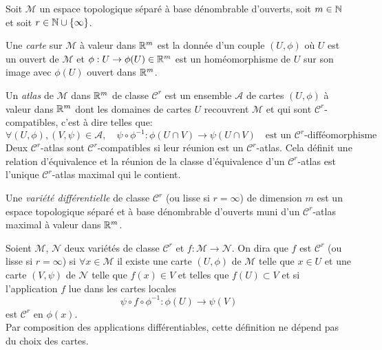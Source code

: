\documentclass[12pt, a4paper]{book}
\begin{document}
Soit $\mathcal{M}$ un espace topologique séparé à base dénombrable d'ouverts, soit $m\in \mathbb{N}$ et soit $r\in \mathbb{N} \cup \{\infty\}$.

\begin{defi}[Carte]
Une \emph{carte} sur $\mathcal{M}$ à valeur dans $\mathbb{R} ^m$ est la donnée d'un couple $(U, \phi)$ où $U$ est un ouvert de $\mathcal{M}$ et $\phi : U \to \phi(U) \in \mathbb{R}^m$ est un homéomorphisme de $U$ sur son image avec $\phi(U)$ ouvert dans $\mathbb{R}^m$.
\end{defi}

\begin{defi}[Atlas]
Un \emph{atlas} de $\mathcal{M}$ dans $\mathbb{R}^m$ de classe $\mathscr{C}^r$ est un ensemble $\mathscr{A}$ de cartes $(U, \phi)$ à valeur dans $\mathbb{R}^m$ dont les domaines de cartes $U$ recouvrent $\mathcal{M}$ et qui sont $\mathscr{C}^r$-compatibles, c'est à dire telles que:
$$\forall (U, \phi), (V, \psi) \in \mathscr{A}, \quad \psi \circ \phi ^{-1} : \phi(U\cap V) \to \psi(U \cap V) \quad \text{est un }\mathscr{C}^r\text{-difféomorphisme}$$
Deux $\mathscr{C}^r$-atlas sont $\mathscr{C}^r$-compatibles si leur réunion est un $\mathscr{C}^r$-atlas. Cela définit une relation d'équivalence et la réunion de la classe d'équivalence d'un $\mathscr{C}^r$-atlas est l'unique $\mathscr{C}^r$-atlas maximal qui le contient.
\end{defi}

\begin{defi}
Une \emph{variété différentielle} de classe $\mathscr{C}^r$ (ou lisse si $r = \infty$) de dimension $m$ est un espace topologique séparé et à base dénombrable d'ouverts muni d'un $\mathscr{C}^r$-atlas maximal à valeur dans $\mathbb{R}^m$.
\end{defi}

\begin{defi}
Soient $\mathcal{M}$, $\mathcal{N}$ deux variétés de classe $\mathscr{C}^r$ et $f: \mathcal{M} \to \mathcal{N}$. On dira que $f$ est $\mathscr{C}^r$ (ou lisse si $r = \infty$) si $\forall x\in \mathcal{M}$ il existe une carte $(U, \phi)$ de $\mathcal{M}$ telle que $x\in U$ et une carte $(V, \psi)$ de $\mathcal{N}$ telle que $f(x) \in V$ et telles que $f(U)\subset V$ et si l'application $f$ lue dans les cartes locales 
$$\psi \circ f \circ \phi^{-1}:\phi(U)\to \psi(V)$$
est $\mathscr{C}^r$ en $\phi(x)$. \\
Par composition des applications différentiables, cette définition ne dépend pas du choix des cartes.
\end{defi}
\end{document}
